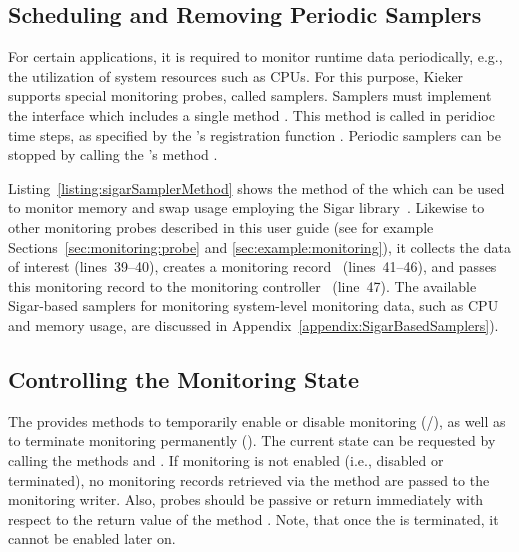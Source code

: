 \subsection{Scheduling and Removing Periodic Samplers}\label{sec:componentsMonitoring:monitoringController:periodicSamplers}

For certain applications, it is required to monitor runtime data periodically, %
e.g., the utilization of system resources such as CPUs. %
For this purpose, Kieker supports special monitoring probes, called samplers. %
Samplers must implement the interface  which includes a %
single method . %
This method is called in peridioc time steps, %
as specified by the 's registration function %
. Periodic samplers can be stopped by %
calling the 's method .

Listing~\ref{listing:sigarSamplerMethod} shows the  method %
of the  which can be used to monitor memory %
and swap usage employing the Sigar library~\cite{HypericSigarWebsite}. %
Likewise to other monitoring probes described in this user guide (see for %
example Sections~\ref{sec:monitoring:probe} and \ref{sec:example:monitoring}), 
it collects the data of interest (lines~39--40), creates a monitoring record~%
(lines~41--46), and passes this monitoring record to the monitoring controller~%
(line~47). %
The available Sigar-based samplers for monitoring system-level monitoring %
data, such as CPU and memory usage, are discussed in Appendix~\ref{appendix:SigarBasedSamplers}). %

\setJavaCodeListing


\subsection{Controlling the Monitoring State}\label{sec:componentsMonitoring:monitoringController:controState}

The  provides methods to temporarily enable or disable monitoring %
(/), as well as to terminate monitoring %
permanently (). %
The current state can be requested by calling the methods  %
and . If monitoring is not enabled (i.e., disabled %
or terminated), no monitoring records retrieved via the method  %
are passed to the monitoring writer. Also, probes should be passive or return immediately %
with respect to the return value of the method . %
Note, that once the  is terminated, it cannot be enabled %
later on. 


